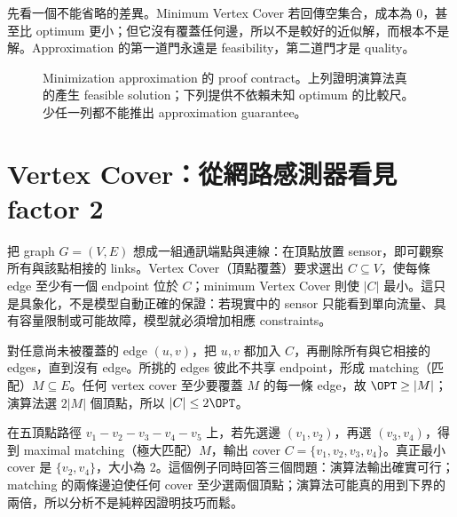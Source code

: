 \documentclass[11pt,a4paper,oneside,openany]{book}
\begin{document}
先看一個不能省略的差異。Minimum Vertex Cover 若回傳空集合，成本為 0，甚至比 optimum 更小；但它沒有覆蓋任何邊，所以不是較好的近似解，而根本不是解。Approximation 的第一道門永遠是 feasibility，第二道門才是 quality。

\begin{figure}[htbp]
\centering
{}
\caption{Minimization approximation 的 proof contract。上列證明演算法真的產生 feasible solution；下列提供不依賴未知 optimum 的比較尺。少任一列都不能推出 approximation guarantee。}
\label{fig:approx-proof-contract}
\end{figure}

\section{Vertex Cover：從網路感測器看見 factor 2}
把 graph $G=(V,E)$ 想成一組通訊端點與連線：在頂點放置 sensor，即可觀察所有與該點相接的 links。Vertex Cover（頂點覆蓋）要求選出 $C\subseteq V$，使每條 edge 至少有一個 endpoint 位於 $C$；minimum Vertex Cover 則使 $|C|$ 最小。這只是具象化，不是模型自動正確的保證：若現實中的 sensor 只能看到單向流量、具有容量限制或可能故障，模型就必須增加相應 constraints。

對任意尚未被覆蓋的 edge $(u,v)$，把 $u,v$ 都加入 $C$，再刪除所有與它相接的 edges，直到沒有 edge。所挑的 edges 彼此不共享 endpoint，形成 matching（匹配）$M\subseteq E$。任何 vertex cover 至少要覆蓋 $M$ 的每一條 edge，故 $\OPT\ge|M|$；演算法選 $2|M|$ 個頂點，所以 $|C|\le2\OPT$。

在五頂點路徑 $v_1-v_2-v_3-v_4-v_5$ 上，若先選邊 $(v_1,v_2)$，再選 $(v_3,v_4)$，得到 maximal matching（極大匹配）$M$，輸出 cover $C=\{v_1,v_2,v_3,v_4\}$。真正最小 cover 是 $\{v_2,v_4\}$，大小為 2。這個例子同時回答三個問題：演算法輸出確實可行；matching 的兩條邊迫使任何 cover 至少選兩個頂點；演算法可能真的用到下界的兩倍，所以分析不是純粹因證明技巧而鬆。
\end{document}
